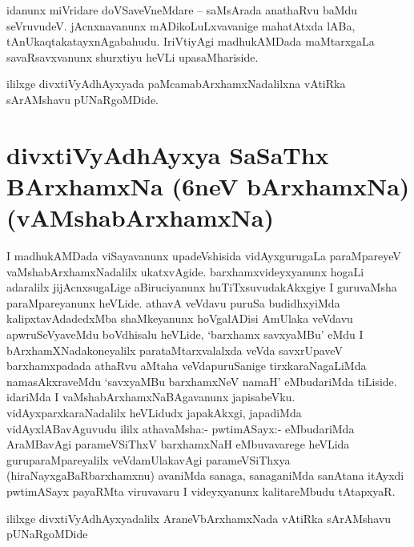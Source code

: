 \begin{artha}
idanunx miVridare doVSaveVneMdare -- saMsArada anathaRvu baMdu seVruvudeV. jAcnxnavanunx 
mADikoLuLxvavanige mahatAtxda lABa, tAnUkaqtakatayxnAgabahudu. IriVtiyAgi madhukAMDada 
maMtarxgaLa savaRsavxvanunx shurxtiyu heVLi upasaMhariside.
\end{artha}

\begin{center}
ililxge divxtiVyAdhAyxyada paMcamabArxhamxNadalilxna vAtiRka sArAMshavu pUNaRgoMDide.
\end{center}

\section*{divxtiVyAdhAyxya SaSaThx BArxhamxNa (6neV bArxhamxNa) (vAMshabArxhamxNa)}

\begin{center}


\end{center}

\begin{artha}
I madhukAMDada viSayavanunx upadeVshisida vidAyxgurugaLa paraMpareyeV vaMshabArxhamxNadalilx ukatxvAgide. barxhamxvideyxyanunx hogaLi adaralilx jijAcnxsugaLige aBiruciyanunx huTiTxsuvudakAkxgiye I guruvaMsha paraMpareyanunx heVLide. \-athavA veVdavu puruSa budidhxyiMda kalipxtavAdadedxMba shaMkeyanunx hoVgalADisi AmUlaka veVdavu apwruSeVyaveMdu boVdhisalu heVLide, `barxhamx savxyaMBu'  eMdu I bArxhamXNadakoneyalilx parataMtarxvalalxda veVda savxrUpaveV barxhamxpadada athaRvu aMtaha veVdapuruSanige tirxkaraNagaLiMda namasAkxraveMdu `savxyaMBu barxhamxNeV namaH' eMbudariMda tiLiside. idariMda I vaMshabArxhamxNaBAgavanunx japisabeVku. vidAyxparxkaraNadalilx heVLidudx japakAkxgi, japadiMda vidAyxlABavAguvudu ililx athavaMsha:- pwtimASayx:- eMbudariMda AraMBavAgi parameVSiThxV barxhamxNaH eMbuvavarege heVLida guruparaMpareyalilx veVdamUlakavAgi parameVSiThxya (hiraNayxgaBaRbarxhamxnu) avaniMda sanaga, sanaganiMda sanAtana itAyxdi pwtimASayx payaRMta viruvavaru I videyxyanunx kalitareMbudu tAtapxyaR.
\end{artha}

\begin{center}
ililxge divxtiVyAdhAyxyadalilx AraneVbArxhamxNada vAtiRka sArAMshavu  pUNaRgoMDide
\end{center}

